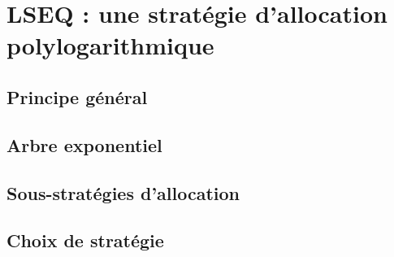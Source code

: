 
\section{LSEQ : une stratégie d'allocation polylogarithmique}

\subsection{Principe général}

\subsection{Arbre exponentiel}

\subsection{Sous-stratégies d'allocation}

\subsection{Choix de stratégie}

